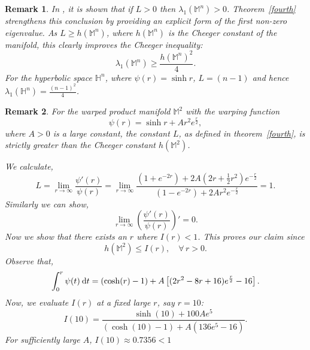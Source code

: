 \documentclass[a4paper,11pt,reqno]{amsart}
\theoremstyle{plain}
\newtheorem{remark}{Remark}[section]
\numberwithin{equation}{section} \allowdisplaybreaks
\newcommand{\hn}{\mathbb{H}^n}
\newcommand{\m}{\mathbb{M}^n}
\newcommand{\dt}{\:{\rm d}t}
\begin{document}
\begin{remark}
\rm
   In \cite[Lemma~4.1]{BFG}, it is shown that if $L>0$ then $\lambda_1(\m)>0$. Theorem~\ref{fourth} strengthens this conclusion by providing an explicit form of the first non-zero eigenvalue. As $L \geq h(\m)$, where $h(\m)$ is the Cheeger constant of the manifold, this clearly improves the Cheeger inequality:
    \begin{equation*}
        \lambda_1(\m)\geq \frac{h(\m)^2}{4}.
    \end{equation*}
    For the hyperbolic space $\hn$, where $\psi(r)=\sinh r$, $L=(n-1)$ and hence $\lambda_1(\hn)=\frac{(n-1)^2}{4}$.\rm
\end{remark}
\begin{remark}\label{strict improvement}
\rm
    For the warped product manifold $\mathbb{M}^2$ with the warping function
    \begin{equation*}
        \psi(r)=\sinh r+Ar^2e^{\frac{r}{2}},
    \end{equation*}
    where $A>0$ is a large constant, the constant $L$, as defined in theorem~\ref{fourth}, is strictly greater than the Cheeger constant $h(\mathbb{M}^2)$. 

    We calculate,
    \begin{equation*}
        L=\lim_{r \to \infty}\frac{\psi'(r)}{\psi(r)}=\lim_{r \to \infty}\frac{\left(1+e^{-2r}\right)+2A\left(2r+\frac{1}{2}r^2\right)e^{-{\frac{r}{2}}}}{\left(1-e^{-2r}\right)+2Ar^2e^{-{\frac{r}{2}}}}=1.
    \end{equation*}
   Similarly we can show,
   \begin{equation*}
       \lim_{r \to \infty}\left(\frac{\psi'(r)}{\psi(r)}\right)'=0.
   \end{equation*}
Now we show that there exists an $r$ where $I(r)<1$. This proves our claim since 
\begin{equation*}
    h(\mathbb{M}^2)\leq I(r),\quad \forall\, r>0.
\end{equation*}
    Observe that,
    \begin{equation*}
        \int_0^r\psi(t)\dt=(\cosh (r)-1)+A\left[(2r^2-8r+16)e^{\frac{r}{2}}-16\right].
    \end{equation*}
    Now, we evaluate $I(r)$ at a fixed large $r$, say $r=10$:
    \begin{equation*}
        I(10)=\frac{\sinh (10)+100Ae^5}{(\cosh (10)-1)+A(136e^5-16)}.
    \end{equation*}
    For sufficiently large $A$, $I(10)\approx 0.7356<1$
    \rm
\end{remark}
\end{document}
